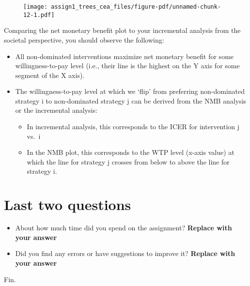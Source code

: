 \documentclass[
  letterpaper,
  DIV=11,
  numbers=noendperiod]{scrartcl}
\begin{document}
\begin{figure}[H]

{\centering \texttt{[image: assign1\_trees\_cea\_files/figure-pdf/unnamed-chunk-12-1.pdf]}

}

\end{figure}

Comparing the net monetary benefit plot to your incremental analysis
from the societal perspective, you should observe the following:

\begin{itemize}
\item
  All non-dominated interventions maximize net monetary benefit for some
  willingness-to-pay level (i.e., their line is the highest on the Y
  axis for some segment of the X axis).
\item
  The willingness-to-pay level at which we `flip' from preferring
  non-dominated strategy i to non-dominated strategy j can be derived
  from the NMB analysis or the incremental analysis:

  \begin{itemize}
  \item
    In incremental analysis, this corresponds to the ICER for
    intervention j vs.~i
  \item
    In the NMB plot, this corresponds to the WTP level (x-axis value) at
    which the line for strategy j crosses from below to above the line
    for strategy i.
  \end{itemize}
\end{itemize}

\hypertarget{last-two-questions}{%
\section{Last two questions}\label{last-two-questions}}

\begin{itemize}
\item
  About how much time did you spend on the assignment? \textbf{Replace
  with your answer}
\item
  Did you find any errors or have suggestions to improve it?
  \textbf{Replace with your answer}
\end{itemize}

Fin.
\end{document}
